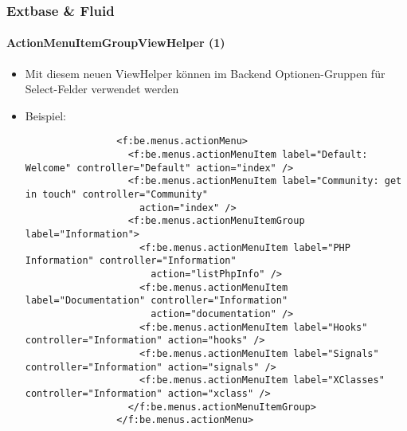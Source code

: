 %

\begin{frame}[fragile]
	\frametitle{Extbase \& Fluid}
	\framesubtitle{ActionMenuItemGroupViewHelper (1)}

	\lstset{basicstyle=\tiny\ttfamily}

	\begin{itemize}

		\item Mit diesem neuen ViewHelper können im Backend Optionen-Gruppen für Select-Felder verwendet werden

		\item Beispiel:
			\begin{lstlisting}
				<f:be.menus.actionMenu>
				  <f:be.menus.actionMenuItem label="Default: Welcome" controller="Default" action="index" />
				  <f:be.menus.actionMenuItem label="Community: get in touch" controller="Community"
				    action="index" />
				  <f:be.menus.actionMenuItemGroup label="Information">
				    <f:be.menus.actionMenuItem label="PHP Information" controller="Information"
				      action="listPhpInfo" />
				    <f:be.menus.actionMenuItem label="Documentation" controller="Information"
				      action="documentation" />
				    <f:be.menus.actionMenuItem label="Hooks" controller="Information" action="hooks" />
				    <f:be.menus.actionMenuItem label="Signals" controller="Information" action="signals" />
				    <f:be.menus.actionMenuItem label="XClasses" controller="Information" action="xclass" />
				  </f:be.menus.actionMenuItemGroup>
				</f:be.menus.actionMenu>
			\end{lstlisting}

	\end{itemize}

\end{frame}

